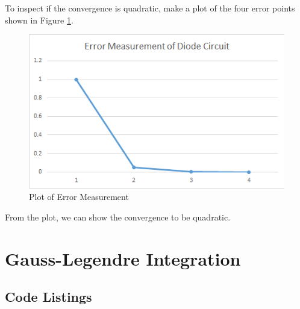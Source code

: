 \documentclass[a4paper,titlepage]{article}
\begin{document}
			To inspect if the convergence is quadratic, make a plot of the four error points shown in Figure \ref{err_measure}.
			\begin{figure}[!h]
				\centering
				\includegraphics[width=\linewidth]{../data/diode_err}
				\caption{Plot of Error Measurement}
				\label{err_measure}
			\end{figure}
		
			From the plot, we can show the convergence to be quadratic. 
			
	\section{Gauss-Legendre Integration}
		
		
	\newpage
	\onecolumn
	\begin{appendices}
		
		\section{Code Listings} \label{appendix:code}
		
		
		\begin{center}
			\inputminted{python}{../polynomial.py}
			\label{lst:poly}
		\end{center}
		\begin{center}
			\inputminted{python}{../interpolation.py}
			\label{lst:interp}
		\end{center}
		\begin{center}
			\inputminted{python}{../nonlinear.py}
			\label{lst:nonlinear}
		\end{center}
	\end{appendices}
\end{document}
